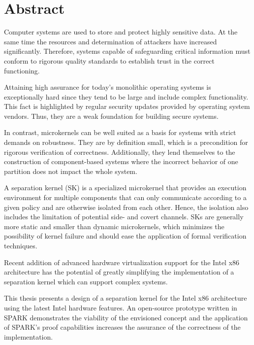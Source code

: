 \chapter*{Abstract}
Computer systems are used to store and protect highly sensitive data. At the
same time the resources and determination of attackers have increased
significantly. Therefore, systems capable of safeguarding critical information
must conform to rigorous quality standards to establish trust in the correct
functioning.

Attaining high assurance for today's monolithic operating systems is
exceptionally hard since they tend to be large and include complex
functionality. This fact is highlighted by regular security updates provided by
operating system vendors. Thus, they are a weak foundation for building secure
systems.

In contrast, microkernels can be well suited as a basis for systems with strict
demands on robustness. They are by definition small, which is a precondition
for rigorous verification of correctness. Additionally, they lend themselves to
the construction of component-based systems where the incorrect behavior of one
partition does not impact the whole system.

A separation kernel (SK) is a specialized microkernel that provides an
execution environment for multiple components that can only communicate
according to a given policy and are otherwise isolated from each other. Hence,
the isolation also includes the limitation of potential side- and covert
channels. SKs are generally more static and smaller than dynamic microkernels,
which minimizes the possibility of kernel failure and should ease the
application of formal verification techniques.

Recent addition of advanced hardware virtualization support for the Intel x86
architecture has the potential of greatly simplifying the implementation of a
separation kernel which can support complex systems.

This thesis presents a design of a separation kernel for the Intel x86
architecture using the latest Intel hardware features. An open-source prototype
written in SPARK demonstrates the viability of the envisioned concept and the
application of SPARK's proof capabilities increases the assurance of the
correctness of the implementation.
